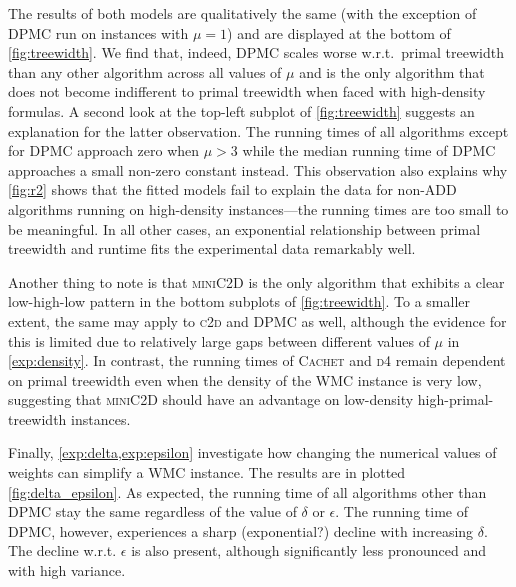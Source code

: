 The results of both models are qualitatively the same (with the exception of \textsc{DPMC} run on instances with $\mu = 1$) and are displayed at the bottom of \cref{fig:treewidth}. We find that, indeed, \textsc{DPMC} scales worse w.r.t.\ primal treewidth than any other algorithm across all values of $\mu$ and is the only algorithm that does not become indifferent to primal treewidth when faced with high-density formulas. A second look at the top-left subplot of \cref{fig:treewidth} suggests an explanation for the latter observation. The running times of all algorithms except for \textsc{DPMC} approach zero when $\mu > 3$ while the median running time of \textsc{DPMC} approaches a small non-zero constant instead. This observation also explains why \cref{fig:r2} shows that the fitted models fail to explain the data for non-ADD algorithms running on high-density instances---the running times are too small to be meaningful. In all other cases, an exponential relationship between primal treewidth and runtime fits the experimental data remarkably well.

Another thing to note is that \textsc{miniC2D} \citep{DBLP:conf/ijcai/OztokD15} is the only algorithm that exhibits a clear low-high-low pattern in the bottom subplots of \cref{fig:treewidth}. To a smaller extent, the same may apply to \textsc{c2d} and \textsc{DPMC} as well, although the evidence for this is limited due to relatively large gaps between different values of $\mu$ in \cref{exp:density}. In contrast, the running times of \textsc{Cachet} and \textsc{d4} remain dependent on primal treewidth even when the density of the \textsf{WMC} instance is very low, suggesting that \textsc{miniC2D} should have an advantage on low-density high-primal-treewidth instances.

Finally, \cref{exp:delta,exp:epsilon} investigate how changing the numerical values of weights can simplify a \textsf{WMC} instance. The results are in plotted \cref{fig:delta_epsilon}. As expected, the running time of all algorithms other than \textsc{DPMC} stay the same regardless of the value of $\delta$ or $\epsilon$. The running time of \textsc{DPMC}, however, experiences a sharp (exponential?) decline with increasing $\delta$. The decline w.r.t. $\epsilon$ is also present, although significantly less pronounced and with high variance.


